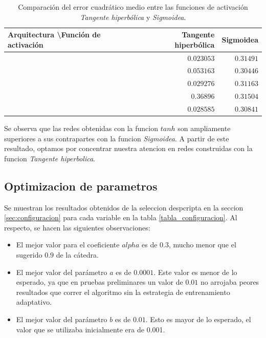 \documentclass[a4paper,10pt]{article}
\begin{document}
     \begin{table}[H]

        \begin{center}
        \begin{tabular}{|l|r|r|}
            \hline
            Arquitectura \textbackslash Función de activación & Tangente hiperbólica & Sigmoidea \\
            \hline
            [2 5 4 1] & $0.023053$ & $0.31491$ \\
            \hline
            [3 10 6 1] & $0.053163$ & $0.30446$  \\
            \hline
            [2 10 6 1] & $0.029276$ & $0.31163$  \\
            \hline
            [2 4 2 1]  & $0.36896$ & $0.31504$  \\
            \hline
            [3 14 8 1] & $0.028585$ & $0.30841$  \\
            \hline
        \end{tabular}
        \end{center}
        \caption{Comparación del error cuadrático medio entre las funciones de activación \textit{Tangente hiperbólica} y \textit{Sigmoidea}.}
        \label{table-comparation-act-functions}

    \end{table}

    Se observa que las redes obtenidas con la funcion $tanh$ son ampliamente superiores a sus contrapartes con la funcion \textit{Sigmoidea}.
    A partir de este resultado, optamos por concentrar nuestra atencion en redes construidas con la funcion \textit{Tangente hiperbolica}.

    \subsection{Optimizacion de parametros}
    \label{sec:parametros-optimos}

        Se muestran los resultados obtenidos de la seleccion despcripta en la seccion \ref{sec:configuracion} para cada variable en la tabla \ref{tabla_configuracion}. 
        Al respecto, se hacen las siguientes observaciones:

        \begin{itemize}
        \item El mejor valor para el coeficiente $alpha$ es de $0.3$, mucho menor que el sugerido $0.9$ de la cátedra.
        \item El mejor valor del parámetro $a$ es de $0.0001$. Este valor es menor de lo esperado, ya que en pruebas preliminares un valor de $0.01$ 
              no arrojaba peores resultados que correr el algoritmo sin la estrategia de entrenamiento adaptativo.
        \item El mejor valor del parámetro $b$ es de $0.01$. Esto es mayor de lo esperado, el valor que se utilizaba inicialmente era de 0.001.
        \end{itemize}
\end{document}
